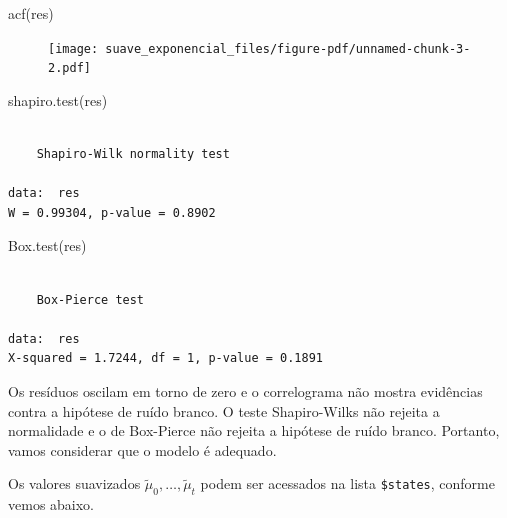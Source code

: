 \documentclass[
  letterpaper,
  DIV=11,
  numbers=noendperiod]{scrreprt}
\newenvironment{Shaded}{\begin{snugshade}}{\end{snugshade}}
\newcommand{\AttributeTok}[1]{\textcolor[rgb]{0.40,0.45,0.13}{#1}}
\newcommand{\DecValTok}[1]{\textcolor[rgb]{0.68,0.00,0.00}{#1}}
\newcommand{\FunctionTok}[1]{\textcolor[rgb]{0.28,0.35,0.67}{#1}}
\newcommand{\NormalTok}[1]{\textcolor[rgb]{0.00,0.23,0.31}{#1}}
\newcommand{\SpecialCharTok}[1]{\textcolor[rgb]{0.37,0.37,0.37}{#1}}
\newcommand{\StringTok}[1]{\textcolor[rgb]{0.13,0.47,0.30}{#1}}
\theoremstyle{definition}
\theoremstyle{plain}
\theoremstyle{definition}
\theoremstyle{plain}
\theoremstyle{remark}
\begin{document}
\begin{Shaded}
\begin{Highlighting}[]
\FunctionTok{acf}\NormalTok{(res)}
\end{Highlighting}
\end{Shaded}

\begin{figure}[H]

{\centering \texttt{[image: suave\_exponencial\_files/figure-pdf/unnamed-chunk-3-2.pdf]}

}

\end{figure}

\begin{Shaded}
\begin{Highlighting}[]
\FunctionTok{shapiro.test}\NormalTok{(res)}
\end{Highlighting}
\end{Shaded}

\begin{verbatim}

    Shapiro-Wilk normality test

data:  res
W = 0.99304, p-value = 0.8902
\end{verbatim}

\begin{Shaded}
\begin{Highlighting}[]
\FunctionTok{Box.test}\NormalTok{(res)}
\end{Highlighting}
\end{Shaded}

\begin{verbatim}

    Box-Pierce test

data:  res
X-squared = 1.7244, df = 1, p-value = 0.1891
\end{verbatim}

Os resíduos oscilam em torno de zero e o correlograma não mostra
evidências contra a hipótese de ruído branco. O teste Shapiro-Wilks não
rejeita a normalidade e o de Box-Pierce não rejeita a hipótese de ruído
branco. Portanto, vamos considerar que o modelo é adequado.

Os valores suavizados \(\tilde{\mu}_0,\ldots,\tilde{\mu}_t\) podem ser
acessados na lista \texttt{\$states}, conforme vemos abaixo.

\begin{Shaded}
\end{Shaded}
\end{document}
